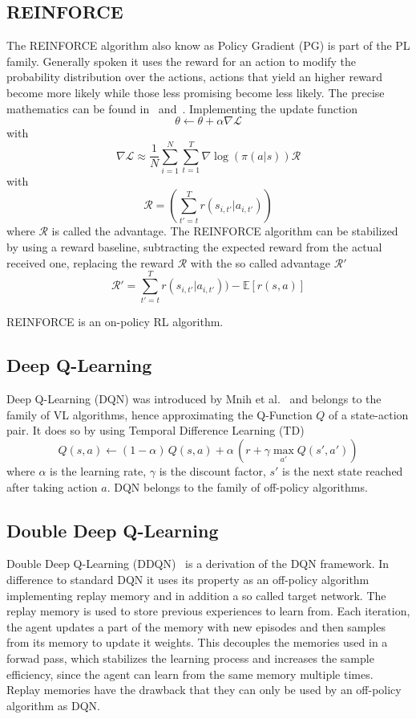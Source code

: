 \documentclass[11pt,a4paper]{article}
\begin{document}
	\subsection{REINFORCE}\label{subsec:policy-gradient}
	The REINFORCE algorithm also know as Policy Gradient (PG) is part of the PL family.
	Generally spoken it uses the reward for an action to modify the probability distribution over the actions, actions that yield an higher reward become more likely while those less promising become less likely.
	The precise mathematics can be found in~\cite[Sutton]{sutton_introduction_1998} and~\cite[Williams]{williams_simple_1992}.
	Implementing the update function
	\[\theta \leftarrow \theta + \alpha \nabla \mathcal{L}\]
	with
	\[\nabla \mathcal{L} \approx \frac{1}{N} \sum^N_{i=1} \sum^T_{t=1} \nabla \log(\pi(a|s))\mathcal{R}\]
	with
	\[ \mathcal{R} = (\sum_{t'=t}^T r(s_{i, t'}|a_{i, t'})) \]
	where $\mathcal{R}$ is called the advantage.
	The REINFORCE algorithm can be stabilized by using a reward baseline, subtracting the expected reward from the actual received one, replacing the reward $\mathcal{R}$ with the so called advantage $\mathcal{R}'$
	\begin{equation}\label{eq:advantage}
		\mathcal{R}' = \sum_{t'=t}^T r(s_{i, t'}|a_{i, t'})) - \mathbb{E}[r(s, a)]
	\end{equation}

	REINFORCE is an on-policy RL algorithm.

	\subsection{Deep Q-Learning}\label{subsec:deep-q-learning}
	Deep Q-Learning (DQN) was introduced by Mnih et al.~\cite{mnih_human-level_2015} and belongs to the family of VL algorithms, hence approximating the Q-Function $Q$ of a state-action pair.
	It does so by using Temporal Difference Learning (TD)
	\[Q(s,a) \leftarrow (1-\alpha)\, Q(s,a) + \alpha\,(r + \gamma \max_{a'}Q(s', a'))\]
	where $\alpha$ is the learning rate, $\gamma$ is the discount factor, $s'$ is the next state reached after taking action $a$.
	DQN belongs to the family of off-policy algorithms.
	
	\subsection{Double Deep Q-Learning}\label{subsec:double-deep-q-learning}
	Double Deep Q-Learning (DDQN)~\cite{van_hasselt_deep_2015} is a derivation of the DQN framework.
	In difference to standard DQN it uses its property as an off-policy algorithm implementing replay memory and in addition a so called target network.
	The replay memory is used to store previous experiences to learn from.
	Each iteration, the agent updates a part of the memory with new episodes and then samples from its memory to update it weights.
	This decouples the memories used in a forwad pass, which stabilizes the learning process and increases the sample efficiency, since the agent can learn from the same memory multiple times.
	Replay memories have the drawback that they can only be used by an off-policy algorithm as DQN.\\
\end{document}
